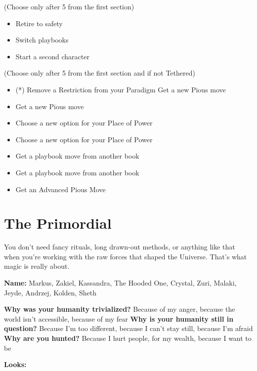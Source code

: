 \documentclass[
]{memoir}
\begin{document}
(Choose only after 5 from the first section)

\begin{itemize}
\tightlist
\item
  Retire to safety
\item
  Switch playbooks
\item
  Start a second character
\end{itemize}

(Choose only after 5 from the first section and if not Tethered)

\begin{itemize}
\tightlist
\item
  (*) Remove a Restriction from your Paradigm Get a new Pious move
\item
  Get a new Pious move
\item
  Choose a new option for your Place of Power
\item
  Choose a new option for your Place of Power
\item
  Get a playbook move from another book
\item
  Get a playbook move from another book
\item
  Get an Advanced Pious Move
\end{itemize}

\newpage

\hypertarget{the-primordial}{%
\section{The Primordial}\label{the-primordial}}

You don't need fancy rituals, long drawn-out methods, or anything like
that when you're working with the raw forces that shaped the Universe.
That's what magic is really about.

\textbf{Name:} Markus, Zakiel, Kassandra, The Hooded One, Crystal, Zuri,
Malaki, Jeyde, Andrzej, Kolden, Sheth

\textbf{Why was your humanity trivialized?} Because of my anger, because
the world isn't accessible, because of my fear \textbf{Why is your
humanity still in question?} Because I'm too different, because I can't
stay still, because I'm afraid\\
\textbf{Why are you hunted?} Because I hurt people, for my wealth,
because I want to be

\textbf{Looks:}
\end{document}
